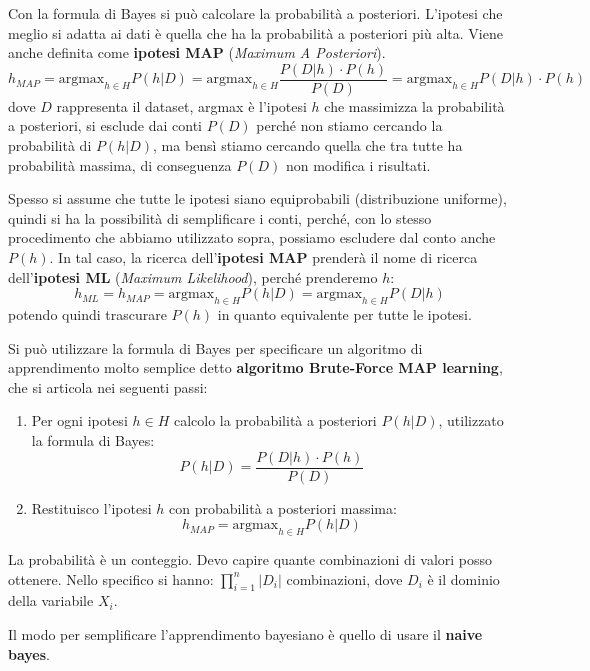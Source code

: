 Con la formula di Bayes si può calcolare la probabilità a posteriori. L'ipotesi
che meglio si adatta ai dati è quella che ha la probabilità a posteriori più alta.
Viene anche definita come \textbf{ipotesi MAP} (\textit{Maximum A Posteriori}).
\begin{equation}
    h_{MAP} = \text{argmax}_{h \in H} P(h|D) = \text{argmax}_{h \in H} \frac{P(D|h)
        \cdot P(h)}{P(D)} = \text{argmax}_{h \in H} P(D|h) \cdot P(h)
\end{equation}
dove $D$ rappresenta il dataset, argmax è l'ipotesi $h$ che massimizza la probabilità
a posteriori, si esclude dai conti $P(D)$ perché non stiamo cercando la probabilità
di $P(h|D)$, ma bensì stiamo cercando quella che tra tutte ha probabilità massima,
di conseguenza $P(D)$ non modifica i risultati.

Spesso si assume che tutte le ipotesi siano equiprobabili (distribuzione uniforme),
quindi si ha la possibilità di semplificare i conti, perché, con lo stesso
procedimento che abbiamo utilizzato sopra, possiamo escludere dal conto anche $P(h)$.
In tal caso, la ricerca dell'\textbf{ipotesi MAP} prenderà il nome di ricerca
dell'\textbf{ipotesi ML} (\textit{Maximum Likelihood}), perché prenderemo $h$:
\begin{equation}
    h_{ML} = h_{MAP} =\text{argmax}_{h \in H} P(h|D) =\text{argmax}_{h \in H} P(D|h)
\end{equation}
potendo quindi trascurare $P(h)$ in quanto equivalente per tutte le ipotesi.

Si può utilizzare la formula di Bayes per specificare un algoritmo di apprendimento
molto semplice detto \textbf{algoritmo Brute-Force MAP learning}, che si articola
nei seguenti passi:
\begin{enumerate}
    \item Per ogni ipotesi $h \in H$ calcolo la probabilità a posteriori $P(h|D)$,
          utilizzato la formula di Bayes:
          \begin{equation}
              P(h|D) = \frac{P(D|h) \cdot P(h)}{P(D)}
          \end{equation}
    \item Restituisco l'ipotesi $h$ con probabilità a posteriori massima:
          \begin{equation}
              h_{MAP} = \text{argmax}_{h \in H} P(h|D)
          \end{equation}
\end{enumerate}
\begin{nota}
    La probabilità è un conteggio. Devo capire quante combinazioni di valori posso
    ottenere. Nello specifico si hanno: $\prod_{i=1}^n |D_i|$ combinazioni, dove
    $D_i$ è il dominio della variabile $X_i$.
\end{nota}
Il modo per semplificare l'apprendimento bayesiano è quello di usare il
\textbf{naive bayes}.


